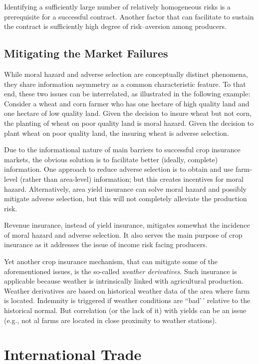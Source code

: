 \documentclass[
  oneside]{book}
\begin{document}
Identifying a sufficiently large number of relatively homogeneous risks is a prerequisite for a successful contract. Another factor that can facilitate to sustain the contract is sufficiently high degree of risk--aversion among producers.

\hypertarget{mitigating-the-market-failures}{%
\section{Mitigating the Market Failures}\label{mitigating-the-market-failures}}

While moral hazard and adverse selection are conceptually distinct phenomena, they share information asymmetry as a common characteristic feature. To that end, these two issues can be interrelated, as illustrated in the following example: Consider a wheat and corn farmer who has one hectare of high quality land and one hectare of low quality land. Given the decision to insure wheat but not corn, the planting of wheat on poor quality land is moral hazard. Given the decision to plant wheat on poor quality land, the insuring wheat is adverse selection.

Due to the informational nature of main barriers to successful crop insurance markets, the obvious solution is to facilitate better (ideally, complete) information. One approach to reduce adverse selection is to obtain and use farm-level (rather than area-level) information; but this creates incentives for moral hazard. Alternatively, area yield insurance can solve moral hazard and possibly mitigate adverse selection, but this will not completely alleviate the production risk.

Revenue insurance, instead of yield insurance, mitigates somewhat the incidence of moral hazard and adverse selection. It also serves the main purpose of crop insurance as it addresses the issue of income risk facing producers.

Yet another crop insurance mechanism, that can mitigate some of the aforementioned issues, is the so-called \emph{weather derivatives}. Such insurance is applicable because weather is intrinsically linked with agricultural production. Weather derivatives are based on historical weather data of the area where farm is located. Indemnity is triggered if weather conditions are ``bad'\,' relative to the historical normal. But correlation (or the lack of it) with yields can be an issue (e.g., not al farms are located in close proximity to weather stations).

\hypertarget{international-trade}{%
\chapter{International Trade}\label{international-trade}}
\end{document}
